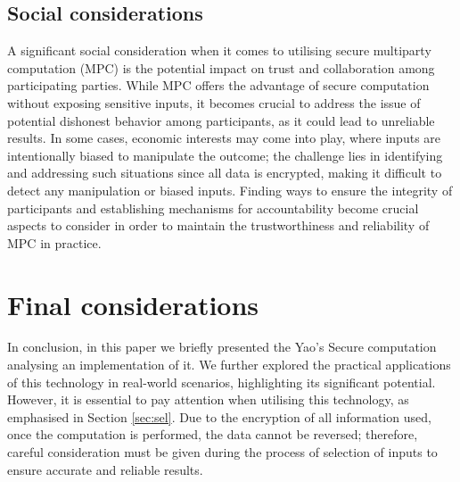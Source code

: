 \documentclass[12pt]{article}
\begin{document}
\subsection{Social considerations}
A significant social consideration when it comes to utilising secure multiparty computation (MPC) is the potential impact on trust and collaboration among participating parties. While MPC offers the advantage of secure computation without exposing sensitive inputs, it becomes crucial to address the issue of potential dishonest behavior among participants, as it could lead to unreliable results. In some cases, economic interests may come into play, where inputs are intentionally biased to manipulate the outcome; the challenge lies in identifying and addressing such situations since all data is encrypted, making it difficult to detect any manipulation or biased inputs. Finding ways to ensure the integrity of participants and establishing mechanisms for accountability become crucial aspects to consider in order to maintain the trustworthiness and reliability of MPC in practice. 
\section{Final considerations}\label{sec:end}
In conclusion, in this paper we briefly presented the Yao's Secure computation analysing an implementation of it. We further explored the practical applications of this technology in real-world scenarios, highlighting its significant potential. However, it is essential to pay attention when utilising this technology, as emphasised in Section \ref{sec:sel}. Due to the encryption of all information used, once the computation is performed, the data cannot be reversed; therefore, careful consideration must be given during the process of selection of inputs to ensure accurate and reliable results.

\end{document}
